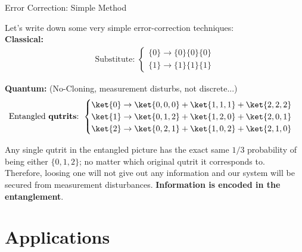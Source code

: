\documentclass[9pt, handout, aspectratio=169]{beamer}		%
\begin{document}

	\begin{frame}{Error Correction: Simple Method}
	
		Let's write down some very simple error-correction techniques: \\
		
		\vspace{10pt}
		\textbf{Classical:} \\  
		\vspace{-10pt}
		\begin{align*}
		\text{Substitute:  }
		\begin{cases}
			\lbrace 0 \rbrace \rightarrow \lbrace 0 \rbrace \lbrace 0 \rbrace \lbrace 0 \rbrace \\
			\lbrace 1 \rbrace \rightarrow \lbrace 1 \rbrace \lbrace 1 \rbrace \lbrace 1 \rbrace 
		\end{cases}
		\end{align*}
		
		\pause
		
		\textbf{Quantum:} (No-Cloning, measurement disturbs, not discrete...) \\  
		\vspace{-4pt}
		\begin{align*}
		\text{Entangled \textbf{qutrits}:  }
		\begin{cases}
			\ket{0} \rightarrow \ket{0,0,0} + \ket{1,1,1} + \ket{2,2,2} \\
			\ket{1} \rightarrow \ket{0,1,2} + \ket{1,2,0} + \ket{2,0,1} \\
			\ket{2} \rightarrow \ket{0,2,1} + \ket{1,0,2} + \ket{2,1,0} 
		\end{cases}
		\end{align*}
		
		\vspace{-0pt}
		Any single qutrit in the entangled picture has the exact same $1/3$ probability of being either $\lbrace 0,1,2 \rbrace$; no matter which original qutrit it corresponds to. Therefore, loosing one will not give out any information and our system will be secured from measurement disturbances. \textbf{Information is encoded in the entanglement}.
		
	\end{frame}
	
	
\section{Applications}
\end{document}
